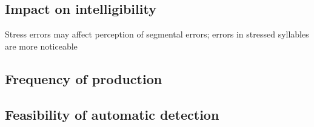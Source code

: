 	
	


		\subsection{Impact on intelligibility}
		\label{sec:targeting:intelligibility}
		\citep{Warren2009}
		
		\citep{Magen1998}
		
		Stress errors may affect perception of segmental errors; errors in stressed syllables are more noticeable \citep{Cutler2005}
				
		
		\subsection{Frequency of production}
		\label{sec:targeting:frequency}
		\citep{Cutler2005}
		
		\citep{Peperkamp2002, Dupoux2001, Dupoux2008}
		
		\subsection{Feasibility of automatic detection}
		\label{sec:targeting:autodetect}
		\citep{ISADEPT, Delmonte2011}
		
		\citep{Bonneau2011}
		
		\citep{Shahin2012a}
		

